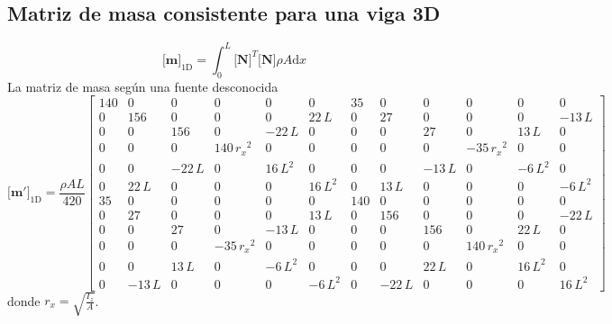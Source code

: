 \documentclass[11pt, a4paper,titlepage]{article}
\newcommand{\di}{\textrm{d}}
\newcommand{\Mme}[1]{\boldsymbol{[}\mathbf{#1} \boldsymbol{]}}
\newcommand{\MN}{\Mme{N}}
\begin{document}
\subsection*{Matriz de masa consistente para una viga 3D}
  \begin{equation}
  	\Mme{m}_{\mathrm{1D}} = \int_0^L \MN^T \MN \rho A \di x
  \end{equation}
  La matriz de masa según una fuente desconocida
  \begin{equation}
  	\Mme{m'}_{\mathrm{1D}}= \frac{\rho A L}{420}\left[\begin{array}{cccccccccccc} 140 & 0 & 0 & 0 & 0 & 0 & 35 & 0 & 0 & 0 & 0 & 0\\ 0 & 156 & 0 & 0 & 0 & 22\,L & 0 & 27 & 0 & 0 & 0 & -13\,L\\ 0 & 0 & 156 & 0 & -22\,L & 0 & 0 & 0 & 27 & 0 & 13\,L & 0\\ 0 & 0 & 0 & 140\,{r_{x}}^2 & 0 & 0 & 0 & 0 & 0 & -35\,{r_{x}}^2 & 0 & 0\\ 0 & 0 & -22\,L & 0 & 16\,L^2 & 0 & 0 & 0 & -13\,L & 0 & -6\,L^2 & 0\\ 0 & 22\,L & 0 & 0 & 0 & 16\,L^2 & 0 & 13\,L & 0 & 0 & 0 & -6\,L^2\\ 35 & 0 & 0 & 0 & 0 & 0 & 140 & 0 & 0 & 0 & 0 & 0\\ 0 & 27 & 0 & 0 & 0 & 13\,L & 0 & 156 & 0 & 0 & 0 & -22\,L\\ 0 & 0 & 27 & 0 & -13\,L & 0 & 0 & 0 & 156 & 0 & 22\,L & 0\\ 0 & 0 & 0 & -35\,{r_{x}}^2 & 0 & 0 & 0 & 0 & 0 & 140\,{r_{x}}^2 & 0 & 0\\ 0 & 0 & 13\,L & 0 & -6\,L^2 & 0 & 0 & 0 & 22\,L & 0 & 16\,L^2 & 0\\ 0 & -13\,L & 0 & 0 & 0 & -6\,L^2 & 0 & -22\,L & 0 & 0 & 0 & 16\,L^2 \end{array}\right]	
  \end{equation}
donde $r_x =\sqrt{ \frac{I_z}{A}}$. 
\end{document}

